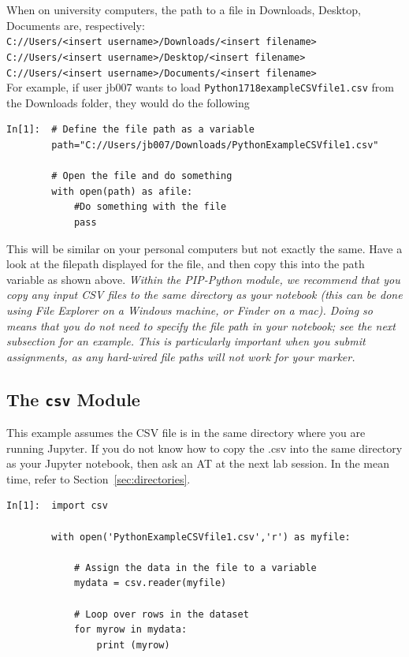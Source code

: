 When on university computers, the path to a file in Downloads, Desktop, Documents are, respectively:\\
{\tt C://Users/<insert username>/Downloads/<insert filename>}\\
{\tt C://Users/<insert username>/Desktop/<insert filename>}\\
{\tt C://Users/<insert username>/Documents/<insert filename>}\\

For example, if user jb007 wants to load {\tt Python1718exampleCSVfile1.csv} from the Downloads folder, they would do the following

\begin{lstlisting}[style=PY]
In[1]:  # Define the file path as a variable
        path="C://Users/jb007/Downloads/PythonExampleCSVfile1.csv"
        
        # Open the file and do something
        with open(path) as afile:
            #Do something with the file
            pass
\end{lstlisting}

This will be similar on your personal computers but not exactly the same. Have a look at the filepath displayed for the file, and then copy this into the path variable as shown above.
\emph{Within the PIP-Python module, we recommend that you copy any input CSV files
to the same directory as your notebook (this can be done using File Explorer
on a Windows machine, or Finder on a mac).
Doing so means that you do not need to specify the file path in your notebook;
see the next subsection for an example.
This is particularly important when you submit assignments,
as any hard-wired file paths will not work for your marker.}

\subsection{The \texttt{csv} Module}
This example assumes the CSV file is in the same directory where you are running Jupyter.  If you do not know how to copy the .csv into the same directory as your Jupyter notebook, then ask an AT at the next lab session. In the mean time, refer to Section~\ref{sec:directories}.

\begin{lstlisting}[style=PY]
In[1]:  import csv

        with open('PythonExampleCSVfile1.csv','r') as myfile:
        
            # Assign the data in the file to a variable
            mydata = csv.reader(myfile)
            
            # Loop over rows in the dataset
            for myrow in mydata:
                print (myrow)
\end{lstlisting}


